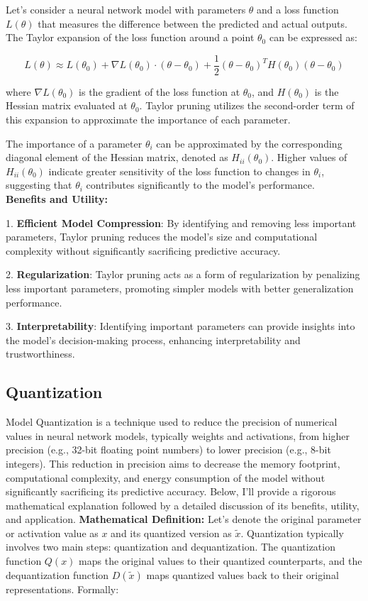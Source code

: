 \documentclass[a4paper]{report}
\begin{document}
{Let's consider a neural network model with parameters $\theta$ and a loss function $L(\theta)$ that measures the difference between the predicted and actual outputs. The Taylor expansion of the loss function around a point $\theta_0$ can be expressed as:

\[ L(\theta) \approx L(\theta_0) + \nabla L(\theta_0) \cdot (\theta - \theta_0) + \frac{1}{2} (\theta - \theta_0)^T H(\theta_0) (\theta - \theta_0) \]

where $\nabla L(\theta_0)$ is the gradient of the loss function at $\theta_0$, and $H(\theta_0)$ is the Hessian matrix evaluated at $\theta_0$. Taylor pruning utilizes the second-order term of this expansion to approximate the importance of each parameter.

The importance of a parameter $\theta_i$ can be approximated by the corresponding diagonal element of the Hessian matrix, denoted as $H_{ii}(\theta_0)$. Higher values of $H_{ii}(\theta_0)$ indicate greater sensitivity of the loss function to changes in $\theta_i$, suggesting that $\theta_i$ contributes significantly to the model's performance.\\
\textbf{Benefits and Utility:}

1. \textbf{Efficient Model Compression}: By identifying and removing less important parameters, Taylor pruning reduces the model's size and computational complexity without significantly sacrificing predictive accuracy.

2. \textbf{Regularization}: Taylor pruning acts as a form of regularization by penalizing less important parameters, promoting simpler models with better generalization performance.

3. \textbf{Interpretability}: Identifying important parameters can provide insights into the model's decision-making process, enhancing interpretability and trustworthiness.

\subsection{Quantization}
Model Quantization is a technique used to reduce the precision of numerical values in neural network models, typically weights and activations, from higher precision (e.g., 32-bit floating point numbers) to lower precision (e.g., 8-bit integers). This reduction in precision aims to decrease the memory footprint, computational complexity, and energy consumption of the model without significantly sacrificing its predictive accuracy. Below, I'll provide a rigorous mathematical explanation followed by a detailed discussion of its benefits, utility, and application.
\newpage
\textbf{Mathematical Definition:}
Let's denote the original parameter or activation value as $x$ and its quantized version as $\tilde{x}$. Quantization typically involves two main steps: quantization and dequantization. The quantization function $Q(x)$ maps the original values to their quantized counterparts, and the dequantization function $D(\tilde{x})$ maps quantized values back to their original representations. Formally:

}
\end{document}

